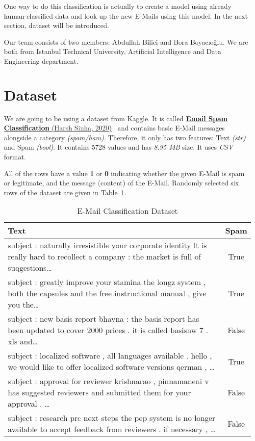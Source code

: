 \documentclass[conference]{IEEEtran}
\begin{document}
One way to do this classification is actually to create a model using already human-classified data and look up the new E-Mails using this model. In the next section, dataset will be introduced.

Our team consists of two members: Abdullah Bilici and Bora Boyacıoğlu. We are both from Istanbul Technical University, Artificial Intelligence and Data Engineering department.

\section{Dataset}
We are going to be using a dataset from Kaggle. It is called \href{https://www.kaggle.com/code/harshsinha1234/email-spam-classification-nlp/input}{\textbf{Email Spam Classification} (Harsh Sinha, 2020)} \cite{dataset} and contains basic E-Mail messages alongside a category \textit{(spam/ham)}. Therefore, it only has two features: Text \textit{(str)} and Spam \textit{(bool)}. It contains 5728 values and has \textit{8.95 MB} size. It uses \textit{CSV} format.

All of the rows have a value \textbf{1} or \textbf{0} indicating whether the given E-Mail is spam or legitimate, and the message (content) of the E-Mail. Randomly selected six rows of the dataset are given in Table \ref{table: dataset preview}.

\begin{table}[h]
    \centering
    \caption{E-Mail Classification Dataset}
    \begin{tabularx}{\columnwidth}{|X|c|}
        \hline
        \textbf{Text} & \textbf{Spam} \\ [0.5ex] 
        \hline\hline
        subject : naturally irresistible your corporate identity  lt is really hard to recollect a company : the  market is full of suqgestions\dots & True \\
        \hline
        subject : greatly improve your stamina  the longz system , both the capsules and the free instructional manual , give  you the\dots & True \\
        \hline
        subject : new basis report  bhavna :  the basis report has been updated to cover 2000 prices . it is called  basisnw 7 . xls and\dots & False \\
        \hline
        subject : localized software , all languages available .  hello , we would like to offer localized software versions qerman , \dots & True \\
        \hline
        subject : approval for reviewer  krishnarao , pinnamaneni v has suggested reviewers and submitted them for your  approval . \dots & False \\
        \hline
        subject : research prc next steps  the pep system is no longer available to accept feedback from reviewers . if  necessary , \dots & False \\
        \hline
    \end{tabularx}
    \label{table: dataset preview}
\end{table}
\end{document}
